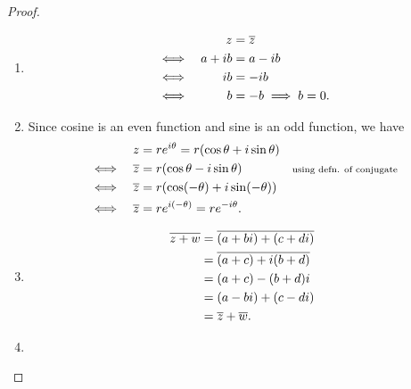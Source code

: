 \documentclass[../MathsNotesBase.tex]{subfiles}
\begin{document}
{		\medskip
		\begin{proof}\nl
			\begin{enumerate}[label=(\roman*)]
				\item{
					\[\begin{aligned}
						&& z &= \overline{z} \\
						&\iff & a + ib &= a - ib \\
						&\iff & ib &= -ib \\
						&\iff & b &= -b \implies b = 0.
					\end{aligned}\]
				}
				\item{
					Since cosine is an even function and sine is an odd function, we have
					\[\begin{aligned}
						&& z &= re^{i\theta} = r(\cos\theta + i\sin\theta) \\
						&\iff & \overline{z} &= r(\cos\theta - i\sin\theta) &\text{\scriptsize{using defn. of conjugate}}\\
						&\iff & \overline{z} &= r(\cos(-\theta) + i\sin(-\theta)) \\ 
						&\iff & \overline{z} &= re^{i(-\theta)} = re^{-i\theta}.
					\end{aligned}\]
				}
				\item{
					\[\begin{aligned}
						\overline{z + w} &= \overline{(a + bi) + (c + di)} \\
						&= \overline{(a + c) + i(b + d)} \\
						&= (a + c) - (b + d)i \\
						&= (a - bi) + (c - di) \\
						&= \overline{z} + \overline{w}.
					\end{aligned}\]
				}
				\item{
}
\end{enumerate}
\end{proof}}
\end{document}
